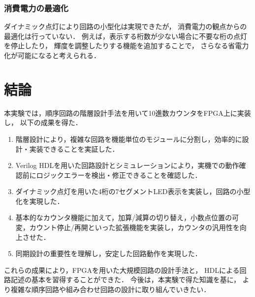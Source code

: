 \documentclass[a4paper,11pt]{ltjsarticle}
\begin{document}
\subsubsection{消費電力の最適化}
ダイナミック点灯により回路の小型化は実現できたが，
消費電力の観点からの最適化は行っていない．
例えば，表示する桁数が少ない場合に不要な桁の点灯を停止したり，
輝度を調整したりする機能を追加することで，
さらなる省電力化が可能になると考えられる．

\section{結論}
本実験では，順序回路の階層設計手法を用いて10進数カウンタをFPGA上に実装し，
以下の成果を得た．

\begin{enumerate}
    \item 階層設計により，複雑な回路を機能単位のモジュールに分割し，効率的に設計・実装できることを実証した．
    \item Verilog HDLを用いた回路設計とシミュレーションにより，実機での動作確認前にロジックエラーを検出・修正できることを確認した．
    \item ダイナミック点灯を用いた4桁の7セグメントLED表示を実装し，回路の小型化を実現した．
    \item 基本的なカウンタ機能に加えて，加算/減算の切り替え，小数点位置の可変，カウント停止/再開といった拡張機能を実装し，カウンタの汎用性を向上させた．
    \item 同期設計の重要性を理解し，安定した回路動作を実現した．
\end{enumerate}

これらの成果により，FPGAを用いた大規模回路の設計手法と，
HDLによる回路記述の基本を習得することができた．
今後は，本実験で得た知識を基に，
より複雑な順序回路や組み合わせ回路の設計に取り組んでいきたい．
\end{document}
